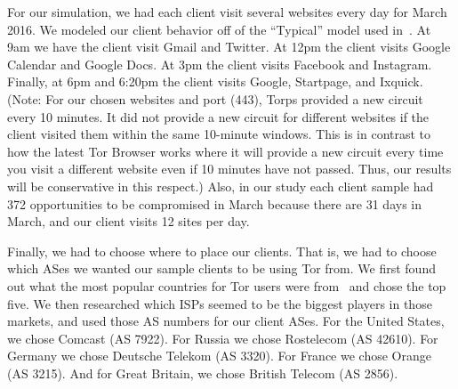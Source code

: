 For our simulation, we had each client visit several websites every day for
March 2016.  We modeled our client behavior off of the ``Typical'' model 
used in~\cite{Johnson2013a}.  At 9am we have the client visit Gmail and Twitter.  
At 12pm the client visits Google Calendar and Google Docs. At 3pm the client 
visits Facebook and Instagram. Finally, at 6pm and 6:20pm the client visits Google, 
Startpage, and Ixquick.  (Note: For our chosen websites and port (443), 
Torps provided a new circuit every 10 minutes.  It did not provide a new circuit 
for different websites if the client visited them within the same 10-minute windows. 
This is in contrast to how the latest Tor Browser works where it will provide a new 
circuit every time you visit a different website even if 10 minutes have not passed.  
Thus, our results will be conservative in this respect.)  Also, in our study each 
client sample had 372 opportunities to be compromised in March because there are 31 
days in March, and our client visits 12 sites per day.

Finally, we had to choose where to place our clients. That is, we had to choose 
which ASes we wanted our sample clients to be using Tor from.  We first found 
out what the most popular countries for Tor users were from~\cite{metrics-countries} 
and chose the top five.  
We then researched which ISPs seemed to be the biggest players in those markets, and 
used those AS numbers for our client ASes.  For the United States, we chose Comcast 
(AS 7922).  For Russia we chose Rostelecom (AS 42610).  For Germany we chose 
Deutsche Telekom (AS 3320).  For France we chose Orange (AS 3215).  And for Great 
Britain, we chose British Telecom (AS 2856).  






